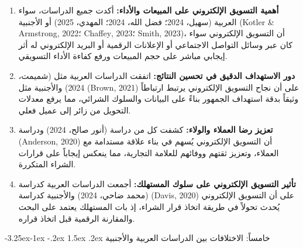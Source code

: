 \documentclass[12pt, a4paper]{report}
\makeatletter
\newcommand{\lr}[1]{\textenglish{#1}}
\renewcommand\subsection{\@startsection{subsection}{2}{\z@}%
  {-3.25ex\@plus -1ex \@minus -.2ex}%
  {1.5ex \@plus .2ex}%
  {\normalfont\large\bfseries\color{sectiongray}}}
\makeatother
\begin{document}
\begin{enumerate}[label=\arabic*.]
  \item \textbf{أهمية التسويق الإلكتروني على المبيعات والأداء:}
  أكدت جميع الدراسات، سواء العربية (سهيل، 2024؛ فضل الله، 2024؛ المهدي، 2025) أو الأجنبية (\lr{Kotler \& Armstrong}, 2022؛ \lr{Chaffey}, 2023؛ \lr{Smith}, 2023)، أن التسويق الإلكتروني سواء كان عبر وسائل التواصل الاجتماعي أو الإعلانات الرقمية أو البريد الإلكتروني له أثر إيجابي مباشر على حجم المبيعات ورفع كفاءة الأداء التسويقي.

  \item \textbf{دور الاستهداف الدقيق في تحسين النتائج:}
  اتفقت الدراسات العربية مثل (شميمت، 2024) والأجنبية مثل (\lr{Brown}, 2021) على أن نجاح التسويق الإلكتروني يرتبط ارتباطاً وثيقاً بدقة استهداف الجمهور بناءً على البيانات والسلوك الشرائي، مما يرفع معدلات التحويل من زائر إلى عميل فعلي.

  \item \textbf{تعزيز رضا العملاء والولاء:}
  كشفت كل من دراسة (أنور صالح، 2024) ودراسة (\lr{Anderson}, 2020) أن التسويق الإلكتروني يُسهم في بناء علاقة مستدامة مع العملاء، وتعزيز ثقتهم ووفائهم للعلامة التجارية، مما ينعكس إيجاباً على قرارات الشراء المتكررة.

  \item \textbf{تأثير التسويق الإلكتروني على سلوك المستهلك:}
  أجمعت الدراسات العربية كدراسة (محمد ضاحي، 2024) والأجنبية كدراسة (\lr{Davis}, 2020) على أن التسويق الإلكتروني يُحدث تحولاً في طريقة اتخاذ قرار الشراء، إذ بات المستهلك يعتمد على البحث والمقارنة الرقمية قبل اتخاذ قراره.
\end{enumerate}

\subsection{خامساً: الاختلافات بين الدراسات العربية والأجنبية}
\end{document}
